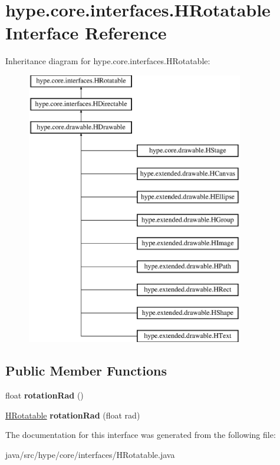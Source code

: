 \hypertarget{interfacehype_1_1core_1_1interfaces_1_1_h_rotatable}{\section{hype.\-core.\-interfaces.\-H\-Rotatable Interface Reference}
\label{interfacehype_1_1core_1_1interfaces_1_1_h_rotatable}
}
Inheritance diagram for hype.\-core.\-interfaces.\-H\-Rotatable\-:\begin{figure}[H]
\begin{center}
\leavevmode
\includegraphics[height=12.000000cm]{interfacehype_1_1core_1_1interfaces_1_1_h_rotatable}
\end{center}
\end{figure}
\subsection*{Public Member Functions}
\begin{DoxyCompactItemize}
\item 
\hypertarget{interfacehype_1_1core_1_1interfaces_1_1_h_rotatable_abbe365e4c5bf9b14a69541237579b0ba}{float {\bfseries rotation\-Rad} ()}\label{interfacehype_1_1core_1_1interfaces_1_1_h_rotatable_abbe365e4c5bf9b14a69541237579b0ba}

\item 
\hypertarget{interfacehype_1_1core_1_1interfaces_1_1_h_rotatable_ae29b9630875f17f091fa6b1b342338fb}{\hyperlink{interfacehype_1_1core_1_1interfaces_1_1_h_rotatable}{H\-Rotatable} {\bfseries rotation\-Rad} (float rad)}\label{interfacehype_1_1core_1_1interfaces_1_1_h_rotatable_ae29b9630875f17f091fa6b1b342338fb}

\end{DoxyCompactItemize}


The documentation for this interface was generated from the following file\-:\begin{DoxyCompactItemize}
\item 
java/src/hype/core/interfaces/H\-Rotatable.\-java\end{DoxyCompactItemize}
